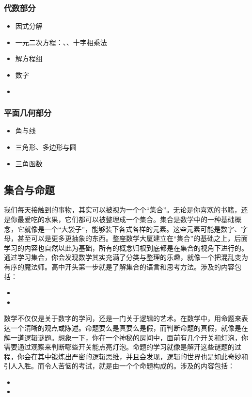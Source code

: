 \subsubsection{代数部分}

\begin{itemize}
\item 因式分解%
\item 一元二次方程：、、十字相乘法
\item 解方程组
\item 数字
\item {}
\end{itemize}

\subsubsection{平面几何部分}

\begin{itemize}
\item 角与线
\item 三角形、多边形与圆
\item 三角函数
\end{itemize}

\subsection{集合与命题}

我们每天接触到的事物，其实可以被视为一个个“集合”。无论是你喜欢的书籍，还是你最爱吃的水果，它们都可以被整理成一个集合。集合是数学中的一种基础概念，它就像是一个“大袋子”，能够装下各式各样的元素。这些元素可能是数字、字母，甚至可以是更多更抽象的东西。整座数学大厦建立在“集合”的基础之上，后面学习的内容也自然以此为基础，所有的概念归根到底都是在集合的视角下进行的。通过学习集合，你会发现数学其实充满了分类与整理的乐趣，就像一个把混乱变为有序的魔法师。高中开头第一步就是了解集合的语言和思考方法。涉及的内容包括：
\begin{itemize}
\item {}
\item {}
\end{itemize}

数学不仅仅是关于数字的学问，还是一门关于逻辑的艺术。在数学中，用命题来表达一个清晰的观点或陈述。命题要么是真要么是假，而判断命题的真假，就像是在解一道逻辑谜题。想象一下，你在一个神秘的房间中，面前有几个开关和灯泡，你需要通过观察来判断哪些开关能点亮灯泡。命题的学习就像是解开这些谜题的过程，你会在其中锻炼出严密的逻辑思维，并且会发现，逻辑的世界也是如此奇妙和引人入胜。而令人苦恼的考试，就是由一个个命题构成的。涉及的内容包括：
\begin{itemize}
\item {}
\item {}
\end{itemize}

